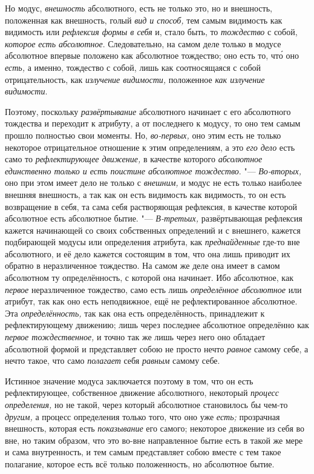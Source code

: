 Но модус, {\em внешность} абсолютного, есть не только
это, но и внешность, положенная как внешность, голый
{\em вид и способ,} тем самым видимость как видимость
или {\em рефлексия формы в себя} и, стало быть, то {\em тождество} с собой,
{\em которое есть абсолютное}. Следовательно, на самом
деле только в модусе абсолютное впервые положено как абсолютное тождество;
оно есть то, чт\'{о} оно {\em есть,} а именно, тождество с
собой, лишь как соотносящаяся с собой отрицательность, как
{\em излучение видимости,} положенное {\em как излучение видимости}.

Поэтому, поскольку {\em развёртывание} абсолютного
начинает с его абсолютного тождества и переходит к атрибуту, а от
последнего к модусу, то оно тем самым прошло полностью свои моменты. Но,
{\em во-первых,} оно этим есть не только некоторое
отрицательное отношение к этим определениям, а это {\em его дело} есть само то
{\em рефлектирующее движение,} в качестве которого
{\em абсолютное единственно только и есть поистине
абсолютное тождество}. "--- {\em Во-вторых,} оно при этом
имеет дело не только с {\em внешним,} и модус не есть
только наиболее внешняя внешность, а так как он есть видимость как
видимость, то он есть возвращение в себя, та сама себя растворяющая
рефлексия, в качестве которой абсолютное есть абсолютное бытие. "---
{\em В-третьих,} развёртывающая рефлексия кажется
начинающей со своих собственных определений и с внешнего, кажется
подбирающей модусы или определения атрибута, как
{\em преднайденные} где-то вне абсолютного, и её дело
кажется состоящим в том, что она лишь приводит их обратно в неразличенное
тождество. На самом же деле она имеет в самом абсолютном ту определённость,
с которой она начинает. Ибо абсолютное, как
{\em первое} неразличенное тождество, само есть лишь
{\em определённое абсолютное} или атрибут, так как оно
есть неподвижное, ещё не рефлектированное абсолютное. Эта
{\em определённость,} так как она есть определённость,
принадлежит к рефлектирующему движению; лишь через последнее абсолютное
определённо как {\em первое тождественное,} и точно так
же лишь через него оно обладает абсолютной формой и представляет собою не
просто нечто {\em равное} самому себе, а нечто такое,
что само {\em полагает} себя
{\em равным} самому себе.

Истинное значение модуса заключается поэтому в том, что он есть
рефлектирующее, собственное движение абсолютного, некоторый
{\em процесс определения,} но не такой, через который
абсолютное становилось бы чем-то {\em другим,} а
процесс определения только того, что оно уже
{\em есть;} прозрачная внешность, которая есть
{\em показывание} его самого; некоторое движение из
себя во вне, но таким образом, что это во-вне направленное бытие есть в
такой же мере и сама внутренность, и тем самым представляет собою вместе с
тем такое полагание, которое есть всё только положенность, но абсолютное бытие.

